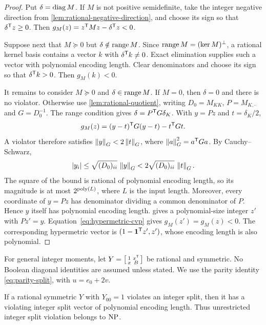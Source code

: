 \begin{proof}
Put $\delta=\operatorname{diag} M$. If $M$ is not positive semidefinite, take the integer
negative direction from \cref{lem:rational-negative-direction}, and choose
its sign so that $\delta^{\mathsf T} z\ge0$. Then
$g_M(z)=z^{\mathsf T} Mz-\delta^{\mathsf T} z<0$.

Suppose next that $M\succeq0$ but $\delta\notin\operatorname{range} M$. Since
$\operatorname{range} M=(\ker M)^\perp$, a rational kernel basis contains a vector $k$
with $\delta^{\mathsf T} k\ne0$. Exact elimination supplies such a vector with
polynomial encoding length. Clear denominators and choose its sign so
that $\delta^{\mathsf T} k>0$. Then $g_M(k)<0$.

It remains to consider $M\succeq0$ and $\delta\in\operatorname{range} M$. If $M=0$,
then $\delta=0$ and there is no violator. Otherwise use
\cref{lem:rational-quotient}, writing $D_0=M_{KK}$, $P=M_{K,\cdot}$ and
$G=D_0^{-1}$. The range condition gives
$\delta=P^{\mathsf T} G\delta_K$. With $y=Pz$ and $t=\delta_K/2$,
\begin{equation}\label{eq:hypermetric-cvp}
 g_M(z)=(y-t)^{\mathsf T} G(y-t)-t^{\mathsf T} Gt.
\end{equation}
A violator therefore satisfies $\left\lVert y\right\rVert_G<2\left\lVert t\right\rVert_G$, where
$\left\lVert a\right\rVert_G^2=a^{\mathsf T} Ga$. By Cauchy--Schwarz,
\[
 |y_i|\le \sqrt{(D_0)_{ii}}\,\left\lVert y\right\rVert_G
 <2\sqrt{(D_0)_{ii}}\,\left\lVert t\right\rVert_G.
\]
The square of the bound is rational of polynomial encoding length, so
its magnitude is at most $2^{\operatorname{poly}(L)}$, where $L$ is the input length.
Moreover, every coordinate of $y=Pz$ has denominator dividing a common
denominator of $P$. Hence $y$ itself has polynomial encoding length.
 gives a polynomial-size integer $z'$ with
$Pz'=y$. Equation~\eqref{eq:hypermetric-cvp} gives $g_M(z')=g_M(z)<0$.
The corresponding hypermetric vector is $(1-\mathbf 1^{\mathsf T} z',z')$, whose
encoding length is also polynomial.
\end{proof}

For general integer moments, let
$Y=\left[\begin{smallmatrix}1&x^{\mathsf T}\\x&B\end{smallmatrix}\right]$
be rational and symmetric. No Boolean diagonal identities are assumed
unless stated. We use the parity identity \eqref{eq:parity-split},
with $u=e_0+2v$.

\begin{lemma}\label{lem:short-split-witness}
If a rational symmetric $Y$ with $Y_{00}=1$ violates an integer split,
then it has a violating integer split vector of polynomial encoding
length. Thus unrestricted integer split violation belongs to $\mathrm{NP}$.
\end{lemma}


